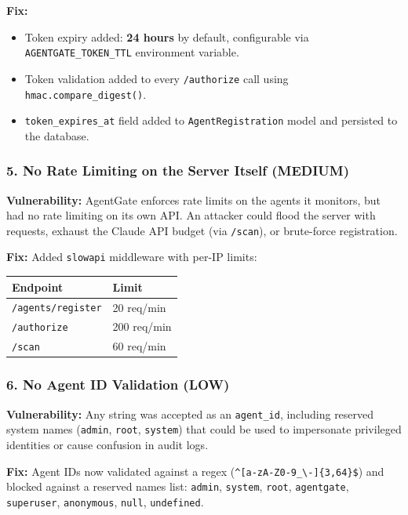 \documentclass[12pt, a4paper]{article}
\begin{document}
\textbf{Fix:}
\begin{itemize}[noitemsep]
  \item Token expiry added: \textbf{24 hours} by default, configurable via
    \texttt{AGENTGATE\_TOKEN\_TTL} environment variable.
  \item Token validation added to every \texttt{/authorize} call using
    \texttt{hmac.compare\_digest()}.
  \item \texttt{token\_expires\_at} field added to \texttt{AgentRegistration}
    model and persisted to the database.
\end{itemize}

\subsubsection{5. No Rate Limiting on the Server Itself (MEDIUM)}

\textbf{Vulnerability:} AgentGate enforces rate limits on the agents it
monitors, but had no rate limiting on its own API. An attacker could flood
the server with requests, exhaust the Claude API budget (via \texttt{/scan}),
or brute-force registration.

\textbf{Fix:} Added \texttt{slowapi} middleware with per-IP limits:

\begin{center}
\begin{tabular}{ll}
\toprule
\textbf{Endpoint} & \textbf{Limit} \\
\midrule
\texttt{/agents/register} & 20 req/min \\
\texttt{/authorize} & 200 req/min \\
\texttt{/scan} & 60 req/min \\
\bottomrule
\end{tabular}
\end{center}

\subsubsection{6. No Agent ID Validation (LOW)}

\textbf{Vulnerability:} Any string was accepted as an \texttt{agent\_id},
including reserved system names (\texttt{admin}, \texttt{root},
\texttt{system}) that could be used to impersonate privileged identities or
cause confusion in audit logs.

\textbf{Fix:} Agent IDs now validated against a regex
(\texttt{\^{}[a-zA-Z0-9\_\textbackslash-]\{3,64\}\$}) and blocked against
a reserved names list: \texttt{admin}, \texttt{system}, \texttt{root},
\texttt{agentgate}, \texttt{superuser}, \texttt{anonymous}, \texttt{null},
\texttt{undefined}.
\end{document}
